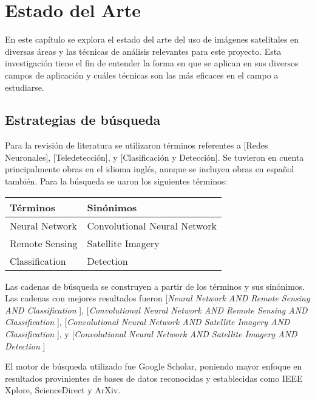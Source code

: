 \section{Estado del Arte}

En este capítulo se explora el estado del arte del uso de imágenes satelitales en diversas áreas y las técnicas de
análisis relevantes para este proyecto. Esta investigación tiene el fin de entender la forma en que se aplican en sus
diversos campos de aplicación y cuáles técnicas son las más eficaces en el campo a estudiarse.

\subsection{Estrategias de búsqueda}

Para la revisión de literatura se utilizaron términos referentes a [Redes Neuronales], [Teledetección], y
[Clasificación y Detección]. Se tuvieron en cuenta principalmente obras en el idioma inglés, aunque se incluyen obras
en español también. Para la búsqueda se uaron los siguientes términos:

\begin{center}
    \begin{tabular}{ l | l }
        {\bf Términos } & {\bf Sinónimos } \\
        \hline
        Neural Network & Convolutional Neural Network \\
        \hline
        Remote Sensing & Satellite Imagery \\
        \hline
        Classification & Detection \\
    \end{tabular}
\end{center}

Las cadenas de búsqueda se construyen a partir de los términos y sus sinónimos. Las cadenas con mejores resultados
fueron
[{\it Neural Network AND Remote Sensing AND Classification }],
[{\it Convolutional Neural Network AND Remote Sensing AND Classification }],
[{\it Convolutional Neural Network AND Satellite Imagery AND Classification }], y
[{\it Convolutional Neural Network AND Satellite Imagery AND Detection }]

El motor de búsqueda utilizado fue Google Scholar, poniendo mayor enfoque en resultados provinientes de bases de datos
reconocidas y establecidas como IEEE Xplore, ScienceDirect y ArXiv.

